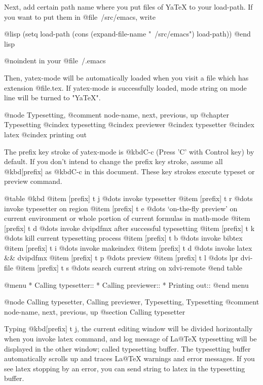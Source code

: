 Next, add certain path name where you put files of YaTeX to your
load-path.  If you want to put them in @file{~/src/emacs}, write

@lisp
       (setq load-path
             (cons (expand-file-name "~/src/emacs") load-path))
@end lisp

@noindent
in your @file{~/.emacs}

  Then, yatex-mode will be automatically loaded when you visit a
file which has extension @file{.tex}.  If yatex-mode is successfully
loaded, mode string on mode line will be turned to "YaTeX".


@node Typesetting, %
@comment  node-name,  next,  previous,  up
@chapter Typesetting
@cindex typesetting
@cindex previewer
@cindex typesetter
@cindex latex
@cindex printing out

  The prefix key stroke of yatex-mode is @kbd{C-c} (Press 'C' with Control
key) by default.  If you don't intend to change the prefix key stroke,
assume all @kbd{[prefix]} as @kbd{C-c} in this document.  These key
strokes execute typeset or preview command.

@table @kbd
@item [prefix] t j
        @dots{} invoke typesetter
@item [prefix] t r
        @dots{} invoke typesetter on region
@item [prefix] t e
        @dots{} `on-the-fly preview' on current environment or whole
         portion of current formulas in math-mode
@item [prefix] t d
	@dots{} invoke dvipdfmx after successful typesetting
@item [prefix] t k
        @dots{} kill current typesetting process
@item [prefix] t b
        @dots{} invoke bibtex
@item [prefix] t i
        @dots{} invoke makeindex
@item [prefix] t d
        @dots{} invoke latex && dvipdfmx
@item [prefix] t p
        @dots{} preview
@item [prefix] t l
        @dots{} lpr dvi-file
@item [prefix] t s
        @dots{} search current string on xdvi-remote
@end table

@menu
* Calling typesetter::
* Calling previewer::
* Printing out::
@end menu

@node Calling typesetter, Calling previewer, Typesetting, Typesetting
@comment  node-name,  next,  previous,  up
@section Calling typesetter

  Typing @kbd{[prefix] t j}, the current editing window will be divided
horizontally when you invoke latex command, and log message of La@TeX{}
typesetting will be displayed in the other window; called typesetting
buffer.  The typesetting buffer automatically scrolls up and traces
La@TeX{} warnings and error messages.  If you see latex stopping by an
error, you can send string to latex in the typesetting buffer.

